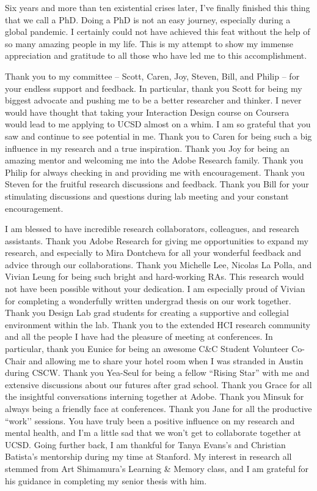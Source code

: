 Six years and more than ten existential crises later, I've finally finished this thing that we call a PhD. Doing a PhD is not an easy journey, especially during a global pandemic. I certainly could not have achieved this feat without the help of so many amazing people in my life. This is my attempt to show my immense appreciation and gratitude to all those who have led me to this accomplishment.
 
Thank you to my committee -- Scott, Caren, Joy, Steven, Bill, and Philip -- for your endless support and feedback. In particular, thank you Scott for being my biggest advocate and pushing me to be a better researcher and thinker. I never would have thought that taking your Interaction Design course on Coursera would lead to me applying to UCSD almost on a whim. I am so grateful that you saw and continue to see potential in me. Thank you to Caren for being such a big influence in my research and a true inspiration. Thank you Joy for being an amazing mentor and welcoming me into the Adobe Research family. Thank you Philip for always checking in and providing me with encouragement. Thank you Steven for the fruitful research discussions and feedback. Thank you Bill for your stimulating discussions and questions during lab meeting and your constant encouragement. 
 
I am blessed to have incredible research collaborators, colleagues, and research assistants. Thank you Adobe Research for giving me opportunities to expand my research, and especially to Mira Dontcheva for all your wonderful feedback and advice through our collaborations. Thank you Michelle Lee, Nicolas La Polla, and Vivian Leung for being such bright and hard-working RAs. This research would not have been possible without your dedication. I am especially proud of Vivian for completing a wonderfully written undergrad thesis on our work together. Thank you Design Lab grad students for creating a supportive and collegial environment within the lab. Thank you to the extended HCI research community and all the people I have had the pleasure of meeting at conferences. In particular, thank you Eunice for being an awesome C\&C Student Volunteer Co-Chair and allowing me to share your hotel room when I was stranded in Austin during CSCW. Thank you Yea-Seul for being a fellow ``Rising Star'' with me and extensive discussions about our futures after grad school. Thank you Grace for all the insightful conversations interning together at Adobe. Thank you Minsuk for always being a friendly face at conferences. Thank you Jane for all the productive ``work’’ sessions. You have truly been a positive influence on my research and mental health, and I'm a little sad that we won't get to collaborate together at UCSD. Going further back, I am thankful for Tanya Evans’s and Christian Batista's mentorship during my time at Stanford. My interest in research all stemmed from Art Shimamura's Learning \& Memory class, and I am grateful for his guidance in completing my senior thesis with him.
 
